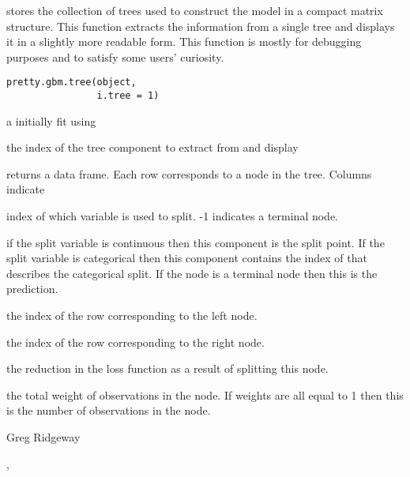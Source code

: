 \documentclass{article}
\begin{document}
\begin{Description}\relax
{} stores the collection of trees used to construct the model in a 
compact matrix structure. This function extracts the information from a single
tree and displays it in a slightly more readable form. This function is mostly
for debugging purposes and to satisfy some users' curiosity.
\end{Description}
\begin{Usage}
\begin{verbatim}
pretty.gbm.tree(object, 
                i.tree = 1)
\end{verbatim}
\end{Usage}
\begin{Arguments}
\begin{ldescription}
\item[\code{object}] a  initially fit using 
\item[\code{i.tree}] the index of the tree component to extract from  
and display 
\end{ldescription}
\end{Arguments}
\begin{Value}
 returns a data frame. Each row corresponds to a node in 
the tree. Columns indicate
\begin{ldescription}
\item[\code{SplitVar}] index of which variable is used to split. -1 indicates a 
terminal node.
\item[\code{SplitCodePred}] if the split variable is continuous then this component
is the split point. If the split variable is categorical then this component
contains the index of  that describes the categorical
split. If the node is a terminal node then this is the prediction.
\item[\code{LeftNode}] the index of the row corresponding to the left node.
\item[\code{RightNode}] the index of the row corresponding to the right node.
\item[\code{ErrorReduction}] the reduction in the loss function as a result of 
splitting this node.
\item[\code{Weight}] the total weight of observations in the node. If weights are all
equal to 1 then this is the number of observations in the node.
\end{ldescription}
\end{Value}
\begin{Author}\relax
Greg Ridgeway 
\end{Author}
\begin{SeeAlso}\relax
{}, 
\end{SeeAlso}
\end{document}
